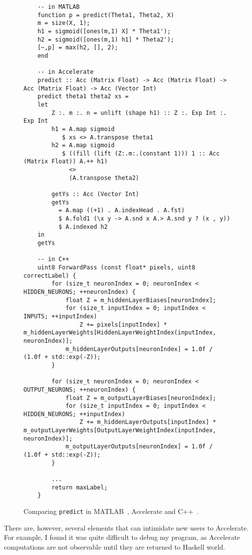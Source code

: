 \begin{figure}
  \begin{lstlisting}
	-- in MATLAB
	function p = predict(Theta1, Theta2, X)
	m = size(X, 1);
	h1 = sigmoid([ones(m,1) X] * Theta1');
	h2 = sigmoid([ones(m,1) h1] * Theta2');
	[~,p] = max(h2, [], 2);
	end
	  	
	-- in Accelerate  	
  	predict :: Acc (Matrix Float) -> Acc (Matrix Float) -> Acc (Matrix Float) -> Acc (Vector Int)
    predict theta1 theta2 xs = 
    let
        Z :. m :. n = unlift (shape h1) :: Z :. Exp Int :. Exp Int
        h1 = A.map sigmoid 
           $ xs <> A.transpose theta1                
        h2 = A.map sigmoid 
           $ ((fill (lift (Z:.m:.(constant 1))) 1 :: Acc (Matrix Float)) A.++ h1)
             <>
             (A.transpose theta2)

        getYs :: Acc (Vector Int)
        getYs
          = A.map ((+1) . A.indexHead . A.fst)
          $ A.fold1 (\x y -> A.snd x A.> A.snd y ? (x , y))
          $ A.indexed h2
    in
    getYs
  	
  	-- in C++
	uint8 ForwardPass (const float* pixels, uint8 correctLabel) {
        for (size_t neuronIndex = 0; neuronIndex < HIDDEN_NEURONS; ++neuronIndex) {
            float Z = m_hiddenLayerBiases[neuronIndex];
            for (size_t inputIndex = 0; inputIndex < INPUTS; ++inputIndex)
                Z += pixels[inputIndex] * m_hiddenLayerWeights[HiddenLayerWeightIndex(inputIndex, neuronIndex)];
            m_hiddenLayerOutputs[neuronIndex] = 1.0f / (1.0f + std::exp(-Z));
        }
 
        for (size_t neuronIndex = 0; neuronIndex < OUTPUT_NEURONS; ++neuronIndex) {
            float Z = m_outputLayerBiases[neuronIndex];
            for (size_t inputIndex = 0; inputIndex < HIDDEN_NEURONS; ++inputIndex)
                Z += m_hiddenLayerOutputs[inputIndex] * m_outputLayerWeights[OutputLayerWeightIndex(inputIndex, neuronIndex)];
            m_outputLayerOutputs[neuronIndex] = 1.0f / (1.0f + std::exp(-Z));
        }

        ...
        return maxLabel;
    }
  \end{lstlisting}
  \caption{Comparing \texttt{predict} in MATLAB~\cite{Ng12}, Accelerate and C++~\cite{Wol17}.}
  \label{fig:eval.syntax.predict}
\end{figure}

There are, however, several elements that can intimidate new users to Accelerate. For example, I found it was quite difficult to debug my program, as Accelerate computations are not observable until they are returned to Haskell world. 

